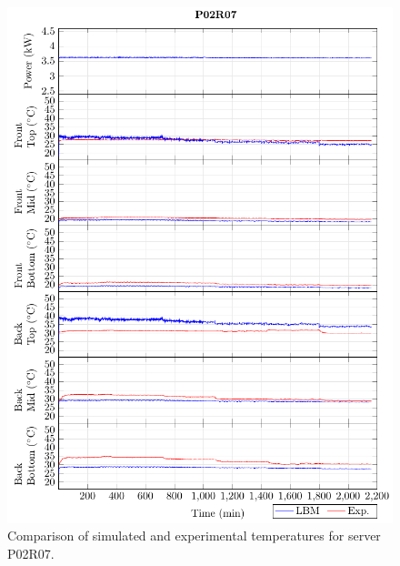 \documentclass[border=10pt,preview]{standalone}
\begin{document}
\begin{figure}[!htb]
\centering
\includegraphics[width=\linewidth]{Plots/P02R07_T.pdf}
\caption{Comparison of simulated and experimental temperatures for server P02R07.}
\label{fig:P02R07_plot}
\end{figure}

\clearpage
\end{document}
